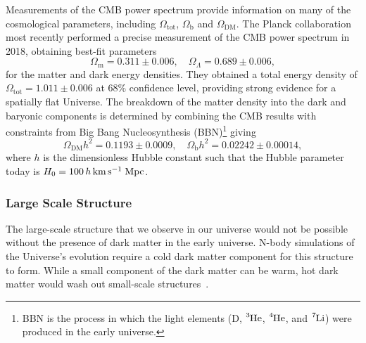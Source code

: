 Measurements of the CMB power spectrum provide information on many of the cosmological parameters, including $\Omega_\mathrm{tot}$, $\Omega_\mathrm{b}$ and $\Omega_\mathrm{DM}$.
The Planck collaboration most recently performed a precise measurement of the CMB power spectrum in 2018, obtaining best-fit parameters~\cite{Planck:2018vyg_sep_Planck2018results,Planck:2019nip_sep_Planck2018results}
\begin{equation}
     \Omega_\mathrm{m} = 0.311 \pm 0.006,\quad \Omega_\Lambda = 0.689 \pm 0.006,
\end{equation}
for the matter and dark energy densities. They obtained a total energy density of $\Omega_\mathrm{tot} = 1.011 \pm 0.006$ at $68\%$ confidence level, providing strong evidence for a spatially flat Universe. 
The breakdown of the matter density into the dark and baryonic components is determined by combining the CMB results with constraints from Big Bang Nucleosynthesis (BBN)\footnote{BBN is the process in which the light elements (D, $\ce{^3 He}$, $\ce{^4 He}$, and $\ce{^7 Li}$) were produced in the early universe.} giving
\begin{equation}
    \Omega_\mathrm{DM}h^2 = 0.1193 \pm 0.0009,\quad \Omega_\mathrm{b}h^2 = 0.02242 \pm 0.00014,
\end{equation}
where $h$ is the dimensionless Hubble constant such that the Hubble parameter today is $H_0 = 100\, h{\rm \,km}{\rm \,s}^{-1}\;\mathrm{Mpc}$. 




\subsubsection*{Large Scale Structure}
The large-scale structure that we observe in our universe would not be possible without the presence of dark matter in the early universe.
N-body simulations of the Universe's evolution require a cold dark matter component for this structure to form. While a small component of the dark matter can be warm, hot dark matter would wash out small-scale structures~\cite{Springel:2005nw_Simulatingjointevolution}.  

